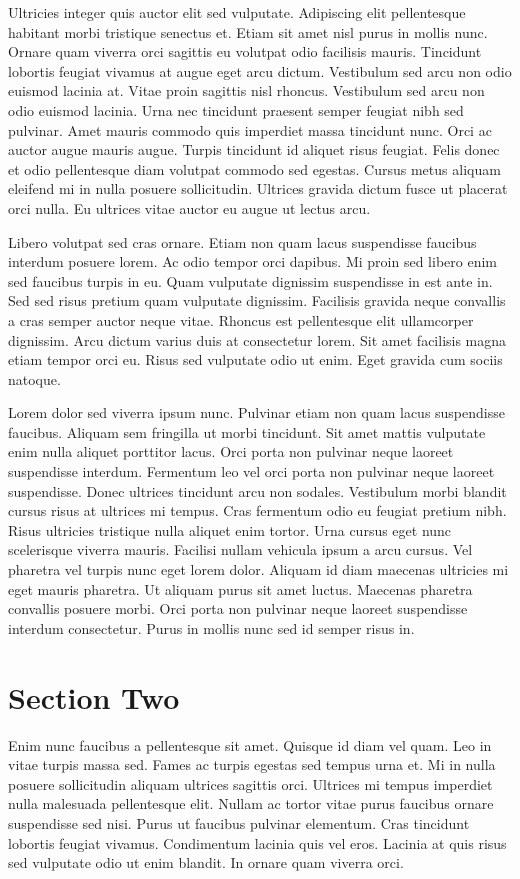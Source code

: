 \documentclass{article}
\begin{document}
Ultricies integer quis auctor elit sed vulputate. Adipiscing elit pellentesque habitant morbi tristique senectus et. Etiam sit amet nisl purus in mollis nunc. Ornare quam viverra orci sagittis eu volutpat odio facilisis mauris. Tincidunt lobortis feugiat vivamus at augue eget arcu dictum. Vestibulum sed arcu non odio euismod lacinia at. Vitae proin sagittis nisl rhoncus. Vestibulum sed arcu non odio euismod lacinia. Urna nec tincidunt praesent semper feugiat nibh sed pulvinar. Amet mauris commodo quis imperdiet massa tincidunt nunc. Orci ac auctor augue mauris augue. Turpis tincidunt id aliquet risus feugiat. Felis donec et odio pellentesque diam volutpat commodo sed egestas. Cursus metus aliquam eleifend mi in nulla posuere sollicitudin. Ultrices gravida dictum fusce ut placerat orci nulla. Eu ultrices vitae auctor eu augue ut lectus arcu.

Libero volutpat sed cras ornare. Etiam non quam lacus suspendisse faucibus interdum posuere lorem. Ac odio tempor orci dapibus. Mi proin sed libero enim sed faucibus turpis in eu. Quam vulputate dignissim suspendisse in est ante in. Sed sed risus pretium quam vulputate dignissim. Facilisis gravida neque convallis a cras semper auctor neque vitae. Rhoncus est pellentesque elit ullamcorper dignissim. Arcu dictum varius duis at consectetur lorem. Sit amet facilisis magna etiam tempor orci eu. Risus sed vulputate odio ut enim. Eget gravida cum sociis natoque.

Lorem dolor sed viverra ipsum nunc. Pulvinar etiam non quam lacus suspendisse faucibus. Aliquam sem fringilla ut morbi tincidunt. Sit amet mattis vulputate enim nulla aliquet porttitor lacus. Orci porta non pulvinar neque laoreet suspendisse interdum. Fermentum leo vel orci porta non pulvinar neque laoreet suspendisse. Donec ultrices tincidunt arcu non sodales. Vestibulum morbi blandit cursus risus at ultrices mi tempus. Cras fermentum odio eu feugiat pretium nibh. Risus ultricies tristique nulla aliquet enim tortor. Urna cursus eget nunc scelerisque viverra mauris. Facilisi nullam vehicula ipsum a arcu cursus. Vel pharetra vel turpis nunc eget lorem dolor. Aliquam id diam maecenas ultricies mi eget mauris pharetra. Ut aliquam purus sit amet luctus. Maecenas pharetra convallis posuere morbi.\cite{Doe} Orci porta non pulvinar neque laoreet suspendisse interdum consectetur. Purus in mollis nunc sed id semper risus in.


\section{Section Two}
Enim nunc faucibus a pellentesque sit amet. Quisque id diam vel quam. Leo in vitae turpis massa sed. Fames ac turpis egestas sed tempus urna et. Mi in nulla posuere sollicitudin aliquam ultrices sagittis orci. Ultrices mi tempus imperdiet nulla malesuada pellentesque elit. Nullam ac tortor vitae purus faucibus ornare suspendisse sed nisi. Purus ut faucibus pulvinar elementum. Cras tincidunt lobortis feugiat vivamus. Condimentum lacinia quis vel eros. Lacinia at quis risus sed vulputate odio ut enim blandit. In ornare quam viverra orci.\cite{Smith}
\end{document}
